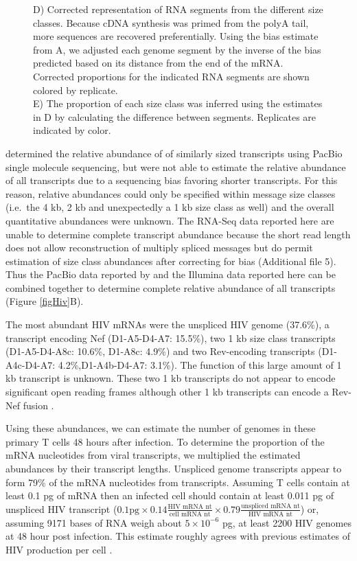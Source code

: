 \documentclass[../sherrill-Mix_thesis.tex]{subfiles}
\begin{document}
\begin{figure}
{{						D) Corrected representation of RNA segments from the different size classes. Because cDNA synthesis was primed from the polyA tail, more \threePrime{} sequences are recovered preferentially. Using the bias estimate from A, we adjusted each genome segment by the inverse of the bias predicted based on its distance from the \threePrime{} end of the mRNA. Corrected proportions for the indicated RNA segments are shown colored by replicate. \\
						E) The proportion of each size class was inferred using the estimates in D by calculating the difference between segments. Replicates are indicated by color.
				}
					\label{figCalculations}
				}
		\end{figure}

		\citet{Ocwieja2012} determined the relative abundance of \hivEight{} of similarly sized transcripts using PacBio single molecule sequencing, but were not able to estimate the relative abundance of all transcripts due to a sequencing bias favoring shorter transcripts.  For this reason, relative abundances could only be specified within message size classes (i.e.\  the 4 kb, 2 kb and unexpectedly a 1 kb size class as well) and the overall quantitative abundances were unknown.  The RNA-Seq data reported here are unable to determine complete transcript abundance because the short read length does not allow reconstruction of multiply spliced messages but do permit estimation of size class abundances after correcting for \threePrime{} bias (Additional file 5). Thus the PacBio data reported by \citet{Ocwieja2012} and the Illumina data reported here can be combined together to determine complete relative abundance of all \hivEight{} transcripts (Figure \ref{figHiv}B). 

	   The most abundant HIV mRNAs were the unspliced HIV genome (37.6\%), a transcript encoding Nef (D1-A5-D4-A7: 15.5\%), two 1 kb size class transcripts (D1-A5-D4-A8c: 10.6\%, D1-A8c: 4.9\%) and two Rev-encoding transcripts (D1-A4c-D4-A7: 4.2\%,D1-A4b-D4-A7: 3.1\%). The function of this large amount of 1 kb transcript is unknown. These two 1 kb transcripts do not appear to encode significant open reading frames although other 1 kb transcripts can encode a Rev-Nef fusion \citep{Ocwieja2012}. 

		Using these abundances, we can estimate the number of \hivEight{} genomes in these pri\-mary T cells 48 hours after infection.  To determine the proportion of the mRNA nucleotides from viral transcripts, we multiplied the estimated abundances by their tran\-script lengths. Unspliced genome tran\-scripts appear to form 79\% of the mRNA nucleotides from \hivEight{} transcripts. Assuming T cells contain at least 0.1 pg of mRNA then an infected cell should contain at least 0.011 pg of unspliced HIV transcript ($0.1 \textrm{pg} \times 0.14\frac{\textrm{HIV mRNA nt}}{\textrm{cell mRNA nt}}\times 0.79\frac{\textrm{unspliced mRNA nt}}{\textrm{HIV mRNA nt}}$) or, assuming 9171 bases of RNA weigh about $5 \times 10^{-6}$ pg, at least 2200 HIV genomes at 48 hour post infection. This estimate rough\-ly agrees with previous estimates of HIV production per cell \citep{Hockett1999,DeBoer2010,Whisnant2013}. 
\end{document}
